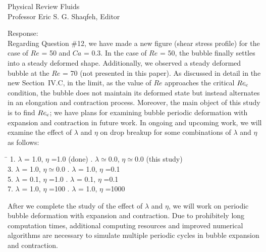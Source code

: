 \documentclass{letter}
\begin{document}
\begin{letter}{
Physical Review Fluids\\
Professor Eric S. G. Shaqfeh, Editor\\}
\begin{enumerate}
Response: \\
{\color{red}  
Regarding Question \#12, we have made a new figure (shear stress profile) for
the case of $Re$ = 50 and $Ca$ = 0.3.  In the case of $Re$ = 50, the bubble
finally settles into a steady deformed shape. Additionally, we observed a
steady deformed bubble at the $Re$ = 70 (not presented in this paper).  As
discussed in detail in the new Section~I\hspace{-1.2pt}V.C, in the limit, as the value of $Re$
approaches the critical $Re_{\rm c}$ condition, the bubble does not maintain
its deformed state but instead alternates in an elongation and contraction
process.  
} Moreover, the main object of this study is to find $Re_{\rm c}$; we have
plans for examining bubble periodic deformation with expansion and contraction
in future work.  In ongoing and upcoming work, we will examine the effect of
$\lambda$ and $\eta$ on drop breakup for some combinations of $\lambda$ and
$\eta$ as follows: 
\\
\begin{tabbing}
 \hspace{55mm} \= \hspace{10mm} \kill
 \hspace{5mm} 1. $\lambda$ = 1.0, $\eta$ =1.0 (done) . $\lambda \simeq 0.0$, $\eta \simeq 0.0$ (this study) \\ 
 \hspace{5mm} 3. $\lambda$ = 1.0, $\eta \simeq 0.0$ . $\lambda$ = 1.0, $\eta$ =0.1 \\
 \hspace{5mm} 5. $\lambda$ = 0.1, $\eta$ =1.0 . $\lambda$ = 0.1, $\eta$ =0.1  \\
 \hspace{5mm} 7. $\lambda$ = 1.0, $\eta$ =100 . $\lambda$ = 1.0, $\eta$ =1000 \\
\end{tabbing}
After we complete the study of the effect of $\lambda$ and $\eta$, we will work
on periodic bubble deformation with expansion and contraction.  Due to
prohibitely long computation times, additional computing resources and improved
numerical algorithms are necessary to simulate multiple periodic cycles in
bubble expansion and contraction.\\


\end{enumerate}
\end{letter}
\end{document}
